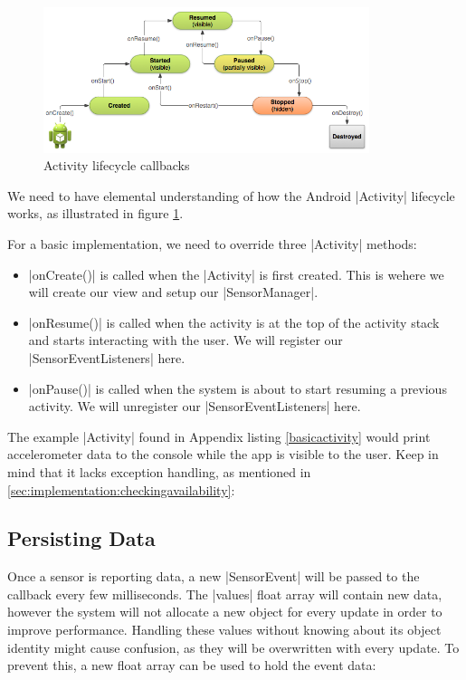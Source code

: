 \begin{figure}[H]
	\centering
	\includegraphics[width=0.85\textwidth]{images/activity_lifecycle.png}
	\caption[Caption for activity_lifecycle]{Activity lifecycle callbacks\footnotemark}
	\label{fig:activityLifecycle}
\end{figure}

We need to have elemental understanding of how the Android |Activity|\cite{androiddocs:activity} lifecycle works, as illustrated in figure \ref{fig:activityLifecycle}.

\clearpage

For a basic implementation, we need to override three |Activity| methods:

\begin{itemize}[noitemsep]
	\item |onCreate()| is called when the |Activity| is first created.
	This is wehere we will create our view and setup our |SensorManager|.
	\item |onResume()| is called when the activity is at the top of the activity stack and starts interacting with the user.
	We will register our |SensorEventListeners| here.
	\item |onPause()| is called when the system is about to start resuming a previous activity.
	We will unregister our |SensorEventListeners| here.
\end{itemize}

The example |Activity| found in Appendix listing \ref{basicactivity} would print accelerometer data to the console while the app is visible to the user.
Keep in mind that it lacks exception handling, as mentioned in \ref{sec:implementation:checkingavailability}:

\subsection{Persisting Data}
Once a sensor is reporting data, a new |SensorEvent| will be passed to the callback every few milliseconds.
The |values| float array will contain new data, however the system will not allocate a new object for every update in order to improve performance.
Handling these values without knowing about its object identity might cause confusion, as they will be overwritten with every update.
To prevent this, a new float array can be used to hold the event data:

